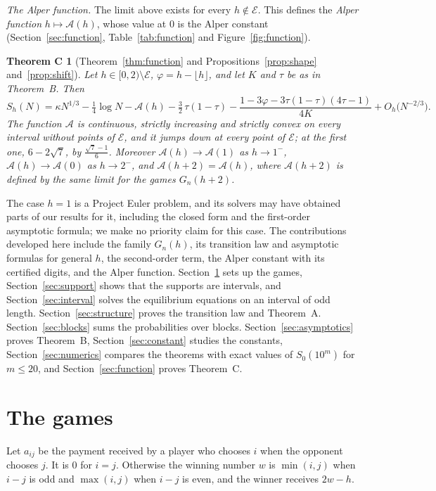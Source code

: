 \documentclass[11pt]{article}
\newtheorem*{theoremC}{Theorem C}
\theoremstyle{definition}
\theoremstyle{remark}
\newcommand{\Alp}{\mathcal{A}}
\begin{document}
\emph{The Alper function.} The limit above exists for every
$h\notin\mathcal E$. This defines the \emph{Alper function}
$h\mapsto\Alp(h)$, whose value at $0$ is the Alper constant
(Section~\ref{sec:function}, Table~\ref{tab:function} and
Figure~\ref{fig:function}).

\begin{theoremC}[Theorem~\ref{thm:function} and
Propositions~\ref{prop:shape} and~\ref{prop:shift}]
Let $h\in[0,2)\setminus\mathcal E$, $\varphi=h-\lfloor h\rfloor$, and let
$K$ and $\tau$ be as in Theorem~B. Then
\[
S_h(N)=\kappa N^{1/3}-\tfrac14\log N-\Alp(h)-\tfrac32\,\tau(1-\tau)
-\frac{1-3\varphi-3\tau(1-\tau)(4\tau-1)}{4K}+O_h\bigl(N^{-2/3}\bigr).
\]
The function $\Alp$ is continuous, strictly increasing and strictly
convex on every interval without points of $\mathcal E$, and it jumps
down at every point of $\mathcal E$; at the first one, $6-2\sqrt7$, by
$\frac{\sqrt7-1}6$. Moreover $\Alp(h)\to\Alp(1)$ as $h\to1^-$,
$\Alp(h)\to\Alp(0)$ as $h\to2^-$, and $\Alp(h+2)=\Alp(h)$, where
$\Alp(h+2)$ is defined by the same limit for the games $G_n(h+2)$.
\end{theoremC}

The case $h=1$ is a Project Euler problem, and its solvers may have
obtained parts of our results for it, including the closed form and the
first-order asymptotic formula; we make no priority claim for this case.
The contributions developed here include the family $G_n(h)$, its
transition law and asymptotic formulas for general $h$, the second-order
term, the Alper constant with its certified digits, and the Alper
function. Section~\ref{sec:game}
sets up the games, Section~\ref{sec:support} shows that the supports are
intervals, and Section~\ref{sec:interval} solves the equilibrium
equations on an interval of odd length. Section~\ref{sec:structure}
proves the transition law and Theorem~A. Section~\ref{sec:blocks} sums the
probabilities over blocks. Section~\ref{sec:asymptotics} proves
Theorem~B, Section~\ref{sec:constant} studies the constants,
Section~\ref{sec:numerics} compares the theorems with exact values of
$S_0(10^m)$ for $m\le20$, and Section~\ref{sec:function} proves Theorem~C.

\section{The games}\label{sec:game}

Let $a_{ij}$ be the payment received by a player who chooses $i$ when the
opponent chooses $j$. It is $0$ for $i=j$. Otherwise the winning number
$w$ is $\min(i,j)$ when $i-j$ is odd and $\max(i,j)$ when $i-j$ is even,
and the winner receives $2w-h$.
\end{document}
